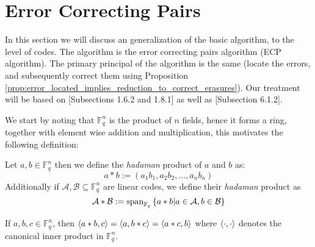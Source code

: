 \section{Error Correcting Pairs}%
In this section we will discuss an generalization of the basic algorithm, to the level of codes. The algorithm is the error correcting pairs algorithm (ECP algorithm). The primary principal of the algorithm is the same (locate the errors, and subsequently correct them using Proposition \ref{prop:error_located_implies_reduction_to_correct_erasures}). Our treatment will be based on \cite{panaccione_phd}[Subsections 1.6.2 and 1.8.1] as well as \cite{AG_codes_and_applications}[Subsection 6.1.2].

We start by noting that $\mathbb{F}_q^n$ is the product of $n$ fields, hence it forms a ring, together with element wise addition and multiplication, this motivates the following definition:
\begin{definition}
  Let $a,b \in \mathbb{F}_q^n$ then we define the \textit{hadaman} product of $a$ and $b$ as:
  \begin{equation*}
    a * b := (a_1b_1, a_2b_2,\ldots, a_nb_{n})
  \end{equation*}
  Additionally if $\mathcal{A}, \mathcal{B} \subseteq \mathbb{F}_q^n$ are linear codes, we define their \textit{hadaman} product as
  \begin{equation*}
    \mathcal{A} * \mathcal{B} := \textnormal{span}_{\mathbb{F}_q} \left\{a * b \middle| a \in \mathcal{A}, b \in \mathcal{B}\right\}
  \end{equation*}
\end{definition}

\begin{remark}\label{rem:canonical_and_hadaman}
  If $a, b, c \in \mathbb{F}_q^n$, then $\langle a * b, c\rangle = \langle a, b * c\rangle = \langle a * c, b\rangle$ where $\langle\cdot, \cdot\rangle$ denotes the canonical inner product in $\mathbb{F}_q^{n}$.
\end{remark}

